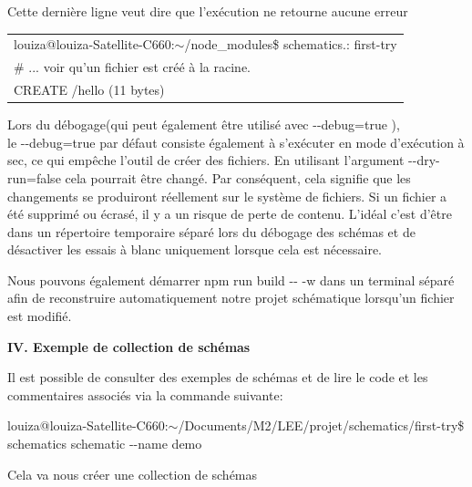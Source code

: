 \documentclass[12pt,french]{article}
\begin{document}
	Cette dernière ligne veut dire que l’exécution ne retourne aucune erreur\newline
	
	\begin{tabular}{l}
		louiza@louiza-Satellite-C660:$\sim$/node\_modules\$ schematics.: first-try \\
		\# ... voir qu'un fichier est créé à la racine. 
\\
		CREATE /hello (11 bytes)
	\end{tabular}\break

	Lors du débogage(qui peut également être utilisé avec \--\--debug=true ),\\ le \--\--debug=true par défaut consiste également à s'exécuter en mode d'exécution à sec, ce qui empêche l'outil de créer des fichiers.\newline
	En utilisant l'argument \--\--dry-run=false cela pourrait être changé. Par conséquent, cela signifie que les changements se produiront réellement sur le système de fichiers. Si un fichier a été supprimé ou écrasé, il y a un risque de perte de contenu. L'idéal c'est d’être dans un répertoire temporaire séparé lors du débogage des schémas et de désactiver les essais à blanc uniquement lorsque cela est nécessaire.\newline
	
	Nous pouvons également démarrer npm run build \--\-- -w dans un terminal séparé afin de reconstruire automatiquement notre projet schématique lorsqu'un fichier est modifié.\newline
	
	\textbf{IV. Exemple de collection de schémas}\newline
	
	Il est possible de consulter des exemples  de schémas et de lire le code et les commentaires associés via la commande suivante:\newline
	
	louiza@louiza-Satellite-C660:$\sim$/Documents/M2/LEE/projet/schematics/first-try\$ schematics schematic \--\--name demo\newline
	
	Cela va nous créer une collection de schémas\newline
		
\end{document}
